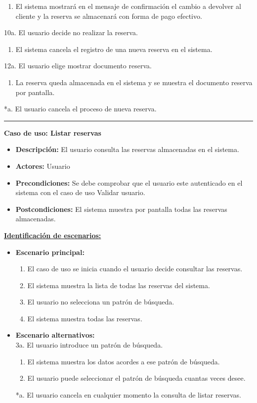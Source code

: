 \begin{itemize}
\begin{enumerate}
		 \item El sistema mostrará en el mensaje de confirmación el cambio a devolver al cliente y la reserva se almacenará con forma de pago efectivo.
		\end{enumerate}
	 10a. El usuario decide no realizar la reserva.
	      \begin{enumerate}
	       \item El sistema cancela el registro de una nueva reserva en el sistema.
	      \end{enumerate}
         12a. El usuario elige mostrar documento reserva.
	      \begin{enumerate}
	       \item La reserva queda almacenada en el sistema y se muestra el documento reserva por pantalla.
	      \end{enumerate}
          *a. El usuario cancela el proceso de nueva reserva.
\end{itemize}
\smallskip
\hrule height 1pt
\smallskip
\textbf{Caso de uso: Listar reservas}
\begin{itemize}\renewcommand{\labelitemi}{$\cdot$}
 \item \textbf{Descripción:} El usuario consulta las reservas almacenadas en el sistema.
  \item \textbf{Actores:} Usuario
  \item \textbf{Precondiciones:} Se debe comprobar que el usuario este autenticado en el sistema con el caso de uso Validar usuario.
  \item \textbf{Postcondiciones:} El sistema muestra por pantalla todas las reservas almacenadas.
\end{itemize}
\underline{\textbf{Identificación de escenarios:}}
\begin{itemize}\renewcommand{\labelitemi}{$\circ$}
 \item \textbf{Escenario principal:}
         \begin{enumerate}
          \item El caso de uso se inicia cuando el usuario decide consultar las reservas.
          \item El sistema muestra la lista de todas las reservas del sistema.
          \item El usuario no selecciona un patrón de búsqueda.
          \item El sistema muestra todas las reservas.
         \end{enumerate}
  \item \textbf{Escenario alternativos:}\\
  			3a. El usuario introduce un patrón de búsqueda.
  			\begin{enumerate}
  			\item El sistema muestra los datos acordes a ese patrón de búsqueda.
  			\item El usuario puede seleccionar el patrón de búsqueda cuantas veces desee.
  			\end{enumerate}
         *a. El usuario cancela en cualquier momento la consulta de listar reservas.
\end{itemize}
